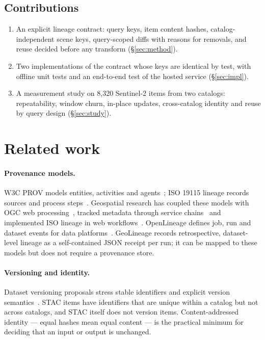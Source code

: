 \documentclass[11pt,a4paper]{article}
\begin{document}
\subsection{Contributions}

\begin{enumerate}
  \item An explicit lineage contract: query keys, item content hashes, catalog-independent scene keys, query-scoped diffs with reasons for removals, and reuse decided before any transform (\S\ref{sec:method}).
  \item Two implementations of the contract whose keys are identical by test, with offline unit tests and an end-to-end test of the hosted service (\S\ref{sec:impl}).
  \item A measurement study on 8{,}320 Sentinel-2 items from two catalogs: repeatability, window churn, in-place updates, cross-catalog identity and reuse by query design (\S\ref{sec:study}).
\end{enumerate}

\section{Related work}

\paragraph{Provenance models.} W3C PROV models entities, activities and agents~\cite{prov}; ISO 19115 lineage records sources and process steps~\cite{iso19115}. Geospatial research has coupled these models with OGC web processing~\cite{zhang2020,closa2021}, tracked metadata through service chains~\cite{yue2010} and implemented ISO lineage in web workflows~\cite{di2013}. OpenLineage defines job, run and dataset events for data platforms~\cite{openlineage}. GeoLineage records retrospective, dataset-level lineage as a self-contained JSON receipt per run; it can be mapped to these models but does not require a provenance store.

\paragraph{Versioning and identity.} Dataset versioning proposals stress stable identifiers and explicit version semantics~\cite{gonzalez2024}. STAC items have identifiers that are unique within a catalog but not across catalogs, and STAC itself does not version items. Content-addressed identity --- equal hashes mean equal content --- is the practical minimum for deciding that an input or output is unchanged.
\end{document}
